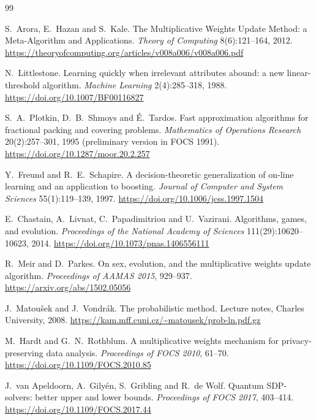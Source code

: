 \documentclass[11pt,a4paper]{article}
\theoremstyle{plain}
\theoremstyle{definition}
\begin{document}
\clearpage
\begin{thebibliography}{99}
\small\raggedright\setlength{\itemsep}{2pt}

 S.~Arora, E.~Hazan and S.~Kale. The Multiplicative Weights Update Method: a Meta-Algorithm and Applications. \emph{Theory of Computing} 8(6):121--164, 2012. \url{https://theoryofcomputing.org/articles/v008a006/v008a006.pdf}

 N.~Littlestone. Learning quickly when irrelevant attributes abound: a new linear-threshold algorithm. \emph{Machine Learning} 2(4):285--318, 1988. \url{https://doi.org/10.1007/BF00116827}

 S.~A.~Plotkin, D.~B.~Shmoys and \'E.~Tardos. Fast approximation algorithms for fractional packing and covering problems. \emph{Mathematics of Operations Research} 20(2):257--301, 1995 (preliminary version in FOCS 1991). \url{https://doi.org/10.1287/moor.20.2.257}

 Y.~Freund and R.~E.~Schapire. A decision-theoretic generalization of on-line learning and an application to boosting. \emph{Journal of Computer and System Sciences} 55(1):119--139, 1997. \url{https://doi.org/10.1006/jcss.1997.1504}

 E.~Chastain, A.~Livnat, C.~Papadimitriou and U.~Vazirani. Algorithms, games, and evolution. \emph{Proceedings of the National Academy of Sciences} 111(29):10620--10623, 2014. \url{https://doi.org/10.1073/pnas.1406556111}

 R.~Meir and D.~Parkes. On sex, evolution, and the multiplicative weights update algorithm. \emph{Proceedings of AAMAS 2015}, 929--937. \url{https://arxiv.org/abs/1502.05056}

 J.~Matou\v{s}ek and J.~Vondr\'ak. The probabilistic method. Lecture notes, Charles University, 2008. \url{https://kam.mff.cuni.cz/~matousek/prob-ln.pdf.gz}

 M.~Hardt and G.~N.~Rothblum. A multiplicative weights mechanism for privacy-preserving data analysis. \emph{Proceedings of FOCS 2010}, 61--70. \url{https://doi.org/10.1109/FOCS.2010.85}

 J.~van Apeldoorn, A.~Gily\'en, S.~Gribling and R.~de Wolf. Quantum SDP-solvers: better upper and lower bounds. \emph{Proceedings of FOCS 2017}, 403--414. \url{https://doi.org/10.1109/FOCS.2017.44}


\end{thebibliography}
\end{document}
